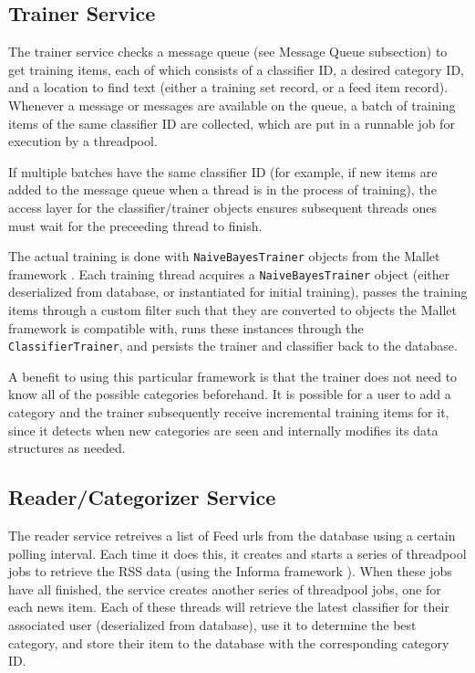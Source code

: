 \documentclass[letterpaper]{article}
\begin{document}
\subsection{Trainer Service}
The trainer service checks a message queue (see Message Queue subsection) to get training items, each of which consists of a classifier ID, a desired category ID, and a location to find text (either a training set record, or a feed item record).
Whenever a message or messages are available on the queue, a batch of training items of the same classifier ID are collected, which are put in a runnable job for execution by a threadpool.

If multiple batches have the same classifier ID (for example, if new items are added to the message queue when a thread is in the process of training), the access layer for the classifier/trainer objects ensures subsequent threads ones must wait for the preceeding thread to finish.

The actual training is done with \texttt{NaiveBayesTrainer} objects from the Mallet framework \cite{McCallumMALLET}.
Each training thread acquires a \texttt{NaiveBayesTrainer} object (either deserialized from database, or instantiated for initial training),
passes the training items through a custom filter such that they are converted to objects the Mallet framework is compatible with,
runs these instances through the \texttt{ClassifierTrainer},
and persists the trainer and classifier back to the database.

A benefit to using this particular framework is that the trainer does not need to know all of the possible categories beforehand. It is possible for a user to add a category and the trainer subsequently receive incremental training items for it, since it detects when new categories are seen and internally modifies its data structures as needed.

\subsection{Reader/Categorizer Service}
The reader service retreives a list of Feed urls from the database using a certain polling interval. Each time it does this, it creates and starts a series of threadpool jobs to retrieve the RSS data (using the Informa framework \cite{Informa}). When these jobs have all finished, the service creates another series of threadpool jobs, one for each news item. Each of these threads will retrieve the latest classifier for their associated user (deserialized from database), use it to determine the best category, and store their item to the database with the corresponding category ID.
\end{document}
